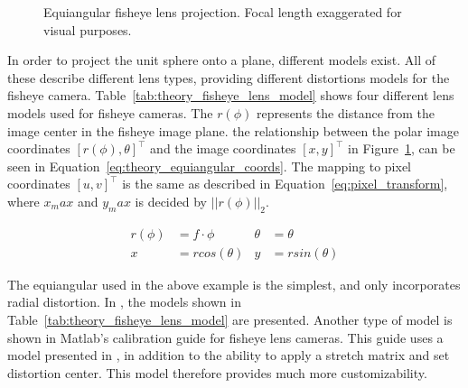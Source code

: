 \begin{figure}[!htb]
    
    \caption{Equiangular fisheye lens projection. Focal length exaggerated for visual purposes.}
    \label{fig:fisheye_spherical_projection}
\end{figure}

In order to project the unit sphere onto a plane, different models exist. All of these describe different lens types, providing different distortions models for the fisheye camera. Table~\ref{tab:theory_fisheye_lens_model} shows four different lens models used for fisheye cameras. The $r(\phi)$ represents the distance from the image center in the fisheye image plane. the relationship between the polar image coordinates $[r(\phi), \theta]^\top$ and the image coordinates $[x,y]^\top$ in Figure~\ref{fig:fisheye_spherical_projection}, can be seen in Equation~\eqref{eq:theory_equiangular_coords}. The mapping to pixel coordinates $[u,v]^\top$ is the same as described in Equation~\eqref{eq:pixel_transform}, where $x_max$ and $y_max$ is decided by $||r(\phi)||_2$.

\begin{align}
    r(\phi) &= f \cdot \phi & \theta &= \theta \nonumber \\
    x &= rcos(\theta) & y &= rsin(\theta)
    \label{eq:theory_equiangular_coords}
\end{align}

The equiangular used in the above example is the simplest, and only incorporates radial distortion. In \cite{FisheyeCorke}, the models shown in Table~\ref{tab:theory_fisheye_lens_model} are presented. Another type of model is shown in Matlab's calibration guide for fisheye lens cameras\cite{MatlabFish}. This guide uses a model presented in \cite{FisheyeKalibration}, in addition to the ability to apply a stretch matrix and set distortion center. This model therefore provides much more customizability.

